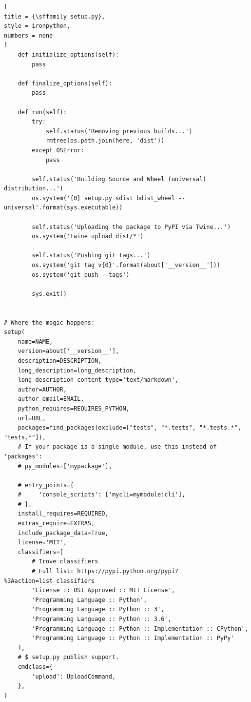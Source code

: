 \documentclass[%
	11pt,
	a4paper,
	utf8,
		]{article}
\begin{document}
\begin{lstlisting}[
title = {\sffamily setup.py},
style = ironpython,
numbers = none	
]
    def initialize_options(self):
        pass

    def finalize_options(self):
        pass

    def run(self):
        try:
            self.status('Removing previous builds...')
            rmtree(os.path.join(here, 'dist'))
        except OSError:
            pass

        self.status('Building Source and Wheel (universal) distribution...')
        os.system('{0} setup.py sdist bdist_wheel --universal'.format(sys.executable))

        self.status('Uploading the package to PyPI via Twine...')
        os.system('twine upload dist/*')

        self.status('Pushing git tags...')
        os.system('git tag v{0}'.format(about['__version__']))
        os.system('git push --tags')

        sys.exit()


# Where the magic happens:
setup(
    name=NAME,
    version=about['__version__'],
    description=DESCRIPTION,
    long_description=long_description,
    long_description_content_type='text/markdown',
    author=AUTHOR,
    author_email=EMAIL,
    python_requires=REQUIRES_PYTHON,
    url=URL,
    packages=find_packages(exclude=["tests", "*.tests", "*.tests.*", "tests.*"]),
    # If your package is a single module, use this instead of 'packages':
    # py_modules=['mypackage'],

    # entry_points={
	#     'console_scripts': ['mycli=mymodule:cli'],
	# },
    install_requires=REQUIRED,
    extras_require=EXTRAS,
    include_package_data=True,
    license='MIT',
    classifiers=[
        # Trove classifiers
        # Full list: https://pypi.python.org/pypi?%3Aaction=list_classifiers
        'License :: OSI Approved :: MIT License',
        'Programming Language :: Python',
        'Programming Language :: Python :: 3',
        'Programming Language :: Python :: 3.6',
        'Programming Language :: Python :: Implementation :: CPython',
        'Programming Language :: Python :: Implementation :: PyPy'
    ],
    # $ setup.py publish support.
    cmdclass={
        'upload': UploadCommand,
    },
)
\end{lstlisting}
\end{document}
